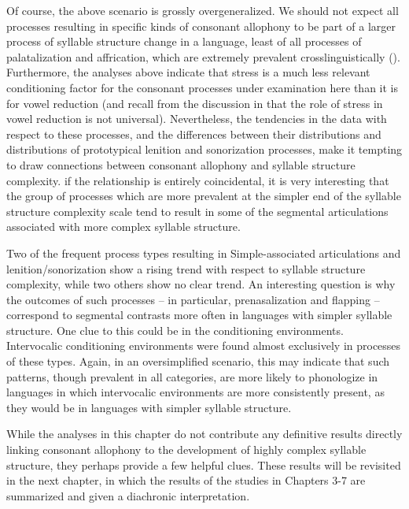   Of course, the above scenario is grossly overgeneralized. We should not expect all processes resulting in specific kinds of consonant allophony to be part of a larger process of syllable structure change in a language, least of all processes of palatalization and affrication, which are extremely prevalent crosslinguistically (\citealt{Bhat1978,Bateman2007}). Furthermore, the analyses above indicate that stress is a much less relevant conditioning factor for the consonant processes under examination here than it is for vowel reduction (and recall from the discussion in  that the role of stress in vowel reduction is not universal). Nevertheless, the tendencies in the data with respect to these processes, and the differences between their distributions and distributions of prototypical lenition and sonorization processes, make it tempting to draw connections between consonant allophony and syllable structure complexity.  if the relationship is entirely coincidental, it is very interesting that the group of processes which are more prevalent at the simpler end of the syllable structure complexity scale tend to result in some of the segmental articulations associated with more complex syllable structure.

  Two of the frequent process types resulting in Simple-associated articulations and lenition/sonorization show a rising trend with respect to syllable structure complexity, while two others show no clear trend. An interesting question is why the outcomes of such processes -- in particular, prenasalization and flapping -- correspond to segmental contrasts more often in languages with simpler syllable structure. One clue to this could be in the conditioning environments. Intervocalic conditioning environments were found almost exclusively in processes of these types. Again, in an oversimplified scenario, this may indicate that such patterns, though prevalent in all categories, are more likely to phonologize in languages in which intervocalic environments are more consistently present, as they would be in languages with simpler syllable structure.

  While the analyses in this chapter do not contribute any definitive results directly linking consonant allophony to the development of highly complex syllable structure, they perhaps provide a few helpful clues. These results will be revisited in the next chapter, in which the results of the studies in Chapters 3-7 are summarized and given a diachronic interpretation.


